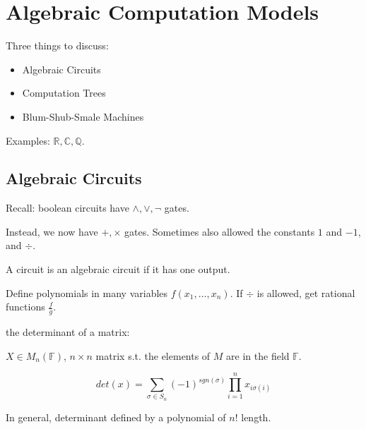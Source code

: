 \documentclass[11pt]{article} %
\begin{document}
\centerline{\LARGE\thishw}

\section{Algebraic Computation Models}

Three things to discuss:
\begin{itemize}
\item Algebraic Circuits
\item Computation Trees
\item Blum-Shub-Smale Machines
\end{itemize}


Examples: $\mathbb{R}, \mathbb{C}, \mathbb{Q}$.


\subsection{Algebraic Circuits}

Recall: boolean circuits have $\wedge, \vee, \neg$ gates.

Instead, we now have $+, \times$ gates. Sometimes also allowed the constants $1$ and $-1$, and $\div$.

A circuit is an algebraic circuit if it has one output.

Define polynomials in many variables $f(x_1, \ldots, x_n)$. If $\div$ is allowed, get rational functions $\frac{f}{g}$.


\midline

 the determinant of a matrix:

$X \in M_n(\mathbb{F})$, $n \times n$ matrix s.t. the elements of $M$ are in the field $\mathbb{F}$.

\begin{equation}
det(x) = \sum_{\sigma \in S_n} (-1)^{sgn(\sigma)} \prod_{i=1}^n x_{i\sigma(i)}
\end{equation}

In general, determinant defined by a polynomial of $n!$ length.
\end{document}
